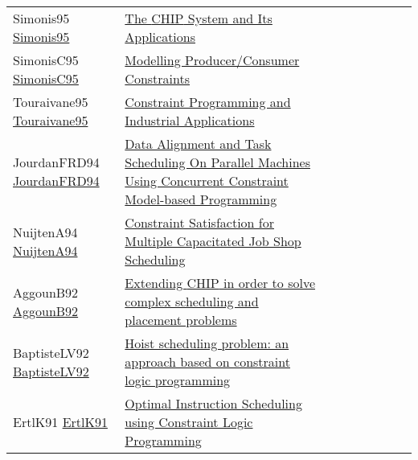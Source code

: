 {\begin{longtable}{p{3cm}p{7cm}lllllll}
Simonis95 \href{https://doi.org/10.1007/3-540-60299-2\_42}{Simonis95} &  \href{papers/Simonis95.pdf}{The {CHIP} System and Its Applications} &  &  &  &  &  &  & \\
SimonisC95 \href{https://doi.org/10.1007/3-540-60299-2\_27}{SimonisC95} &  \href{papers/SimonisC95.pdf}{Modelling Producer/Consumer Constraints} &  &  &  &  &  &  & \\
Touraivane95 \href{https://doi.org/10.1007/3-540-60299-2\_41}{Touraivane95} &  \href{papers/Touraivane95.pdf}{Constraint Programming and Industrial Applications} &  &  &  &  &  &  & \\
JourdanFRD94 \href{}{JourdanFRD94} &  \href{}{Data Alignment and Task Scheduling On Parallel Machines Using Concurrent Constraint Model-based Programming} &  &  &  &  &  &  & \\
NuijtenA94 \href{}{NuijtenA94} &  \href{}{Constraint Satisfaction for Multiple Capacitated Job Shop Scheduling} &  &  &  &  &  &  & \\
AggounB92 \href{}{AggounB92} &  \href{}{Extending {CHIP} in order to solve complex scheduling and placement problems} &  &  &  &  &  &  & \\
BaptisteLV92 \href{https://doi.org/10.1109/ROBOT.1992.220195}{BaptisteLV92} &  \href{papers/BaptisteLV92.pdf}{Hoist scheduling problem: an approach based on constraint logic programming} &  &  &  &  &  &  & \\
ErtlK91 \href{https://doi.org/10.1007/3-540-54444-5\_89}{ErtlK91} &  \href{papers/ErtlK91.pdf}{Optimal Instruction Scheduling using Constraint Logic Programming} &  &  &  &  &  &  & \\
\end{longtable}
}

